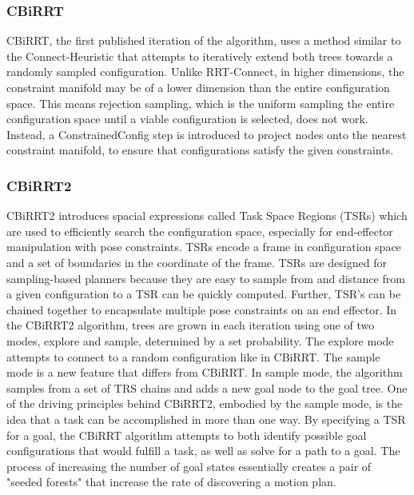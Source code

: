 \documentclass[11pt]{article}
\begin{document}
        \subsubsection{CBiRRT}
            CBiRRT, the first published iteration of the algorithm, uses a method similar to the Connect-Heuristic that attempts to iteratively extend both trees towards a randomly sampled configuration.\cite{berenson_manipulation_2009} Unlike RRT-Connect, in higher dimensions, the constraint manifold may be of a lower dimension than the entire configuration space. This means rejection sampling, which is the uniform sampling the entire configuration space until a viable configuration is selected, does not work. Instead, a ConstrainedConfig step is introduced to project nodes onto the nearest constraint manifold, to ensure that configurations satisfy the given constraints. \cite{berenson_manipulation_2009}
        
        \subsubsection{CBiRRT2} 
            CBiRRT2 introduces spacial expressions called Task Space Regions (TSRs) which are used to efficiently search the configuration space, especially for end-effector manipulation with pose constraints.\cite{berenson_pose-constrained_2009}  TSRs encode a frame in configuration space and a set of boundaries in the coordinate of the frame. TSRs are designed for sampling-based planners because they are easy to sample from and distance from a given configuration to a TSR can be quickly computed. Further, TSR's can be chained together to encapsulate multiple pose constraints on an end effector. In the CBiRRT2 algorithm, trees are grown in each iteration using one of two modes, explore and sample, determined by a set probability. The explore mode attempts to connect to a random configuration like in CBiRRT. The sample mode is a new feature that differs from CBiRRT. In sample mode, the algorithm samples from a set of TRS chains and adds a new goal node to the goal tree. One of the driving principles behind CBiRRT2, embodied by the sample mode, is the idea that a task can be accomplished in more than one way. By specifying a TSR for a goal, the CBiRRT algorithm attempts to both identify possible goal configurations that would fulfill a task, as well as solve for a path to a goal. The process of increasing the number of goal states essentially creates a pair of "seeded forests" that increase the rate of discovering a motion plan. \cite{berenson_pose-constrained_2009} 
\end{document}
